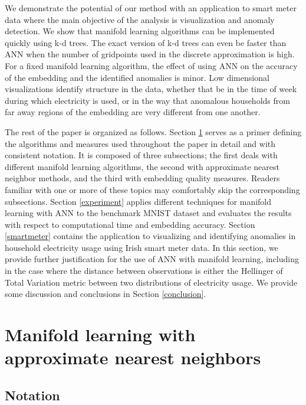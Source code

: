 \documentclass[11pt,a4paper,]{article}
\begin{document}
We demonstrate the potential of our method with an application to smart meter data where the main objective of the analysis is visualization and anomaly detection. We show that manifold learning algorithms can be implemented quickly using k-d trees. The exact version of k-d trees can even be faster than ANN when the number of gridpoints used in the discrete approximation is high. For a fixed manifold learning algorithm, the effect of using ANN on the accuracy of the embedding and the identified anomalies is minor. Low dimensional visualizations identify structure in the data, whether that be in the time of week during which electricity is used, or in the way that anomalous households from far away regions of the embedding are very different from one another.

The rest of the paper is organized as follows.
Section \ref{mlann} serves as a primer defining the algorithms and measures used throughout the paper in detail and with consistent notation. It is composed of three subsections; the first deals with different manifold learning algorithms, the second with approximate nearest neighbor methods, and the third with embedding quality measures. Readers familiar with one or more of these topics may comfortably skip the corresponding subsections. Section \ref{experiment} applies different techniques for manifold learning with ANN to the benchmark MNIST dataset and evaluates the results with respect to computational time and embedding accuracy. Section \ref{smartmeter} contains the application to visualizing and identifying anomalies in household electricity usage using Irish smart meter data. In this section, we provide further justification for the use of ANN with manifold learning, including in the case where the distance between observations is either the Hellinger of Total Variation metric between two distributions of electricity usage. We provide some discussion and conclusions in Section \ref{conclusion}.

\hypertarget{mlann}{%
\section{Manifold learning with approximate nearest neighbors}\label{mlann}}

\hypertarget{notation}{%
\subsection{Notation}\label{notation}}
\end{document}
